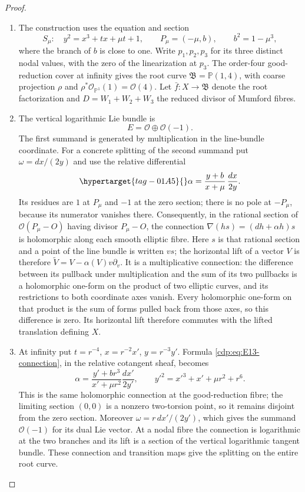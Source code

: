 \begin{proof}

\begin{enumerate}[label=\arabic*.,leftmargin=*]
\item The construction uses the equation and section
\[
 S_\mu:\quad y^2=x^3+tx+\mu t+1,\qquad
 P_\mu=(-\mu,b),\qquad b^2=1-\mu^3,
\]
where the branch of $b$ is close to one. Write $p_1,p_2,p_3$ for its
three distinct nodal values, with the zero of the linearization at
$p_3$. The order-four good-reduction cover at infinity gives the
root curve $\mathfrak B=\mathbb P(1,4)$, with coarse projection
$\rho$ and $\rho^*\mathcal O_{\mathbb P^1}(1)=\mathcal O(4)$.
Let $\bar f:X\to\mathfrak B$ denote the root factorization and
$D=W_1+W_2+W_3$ the reduced divisor of Mumford fibres.

\item The vertical logarithmic Lie bundle is
\[
 E=\mathcal O\oplus\mathcal O(-1).
\]
The first summand is generated by multiplication in the line-bundle
coordinate. For a concrete splitting of the second summand put
$\omega=dx/(2y)$ and use the relative differential
\begin{equation}\hypertarget{tag-01A5}{}\label{cdp:eq:E13-connection}
 \alpha=\frac{y+b}{x+\mu}\,\frac{dx}{2y}.
\end{equation}
Its residues are $1$ at $P_\mu$ and $-1$ at the zero section; there
is no pole at $-P_\mu$, because its numerator vanishes there.
Consequently, in the rational section of
$\mathcal O(P_\mu-O)$ having divisor $P_\mu-O$, the connection
$\nabla(hs)=(dh+\alpha h)s$ is holomorphic along each smooth
elliptic fibre. Here $s$ is that rational section and a point of
the line bundle is written $v s$; the horizontal lift of a vector
$V$ is therefore $\widetilde V=V-\alpha(V)v\partial_v$.
It is a multiplicative connection: the difference between its
pullback under multiplication and the sum of its two pullbacks is a
holomorphic one-form on the product of two elliptic curves, and its
restrictions to both coordinate axes vanish. Every holomorphic
one-form on that product is the sum of forms pulled back from those
axes, so this difference is zero. Its horizontal lift therefore
commutes with the lifted translation defining $X$.

\item At infinity put $t=r^{-4}$, $x=r^{-2}x'$, $y=r^{-3}y'$. Formula
\eqref{cdp:eq:E13-connection}, in the relative cotangent sheaf, becomes
\[
 \alpha=\frac{y'+br^3}{x'+\mu r^2}\frac{dx'}{2y'},
 \qquad y'^2=x'^3+x'+\mu r^2+r^6.
\]
This is the same holomorphic connection at the good-reduction
fibre; the limiting section $(0,0)$ is a nonzero two-torsion point,
so it remains disjoint from the zero section. Moreover
$\omega=r\,dx'/(2y')$, which gives the summand $\mathcal O(-1)$
for its dual Lie vector. At a nodal fibre the connection is
logarithmic at the two branches and its lift is a section of the
vertical logarithmic tangent bundle. These connection and transition maps give the splitting on the
entire root curve.


\end{enumerate}
\end{proof}
